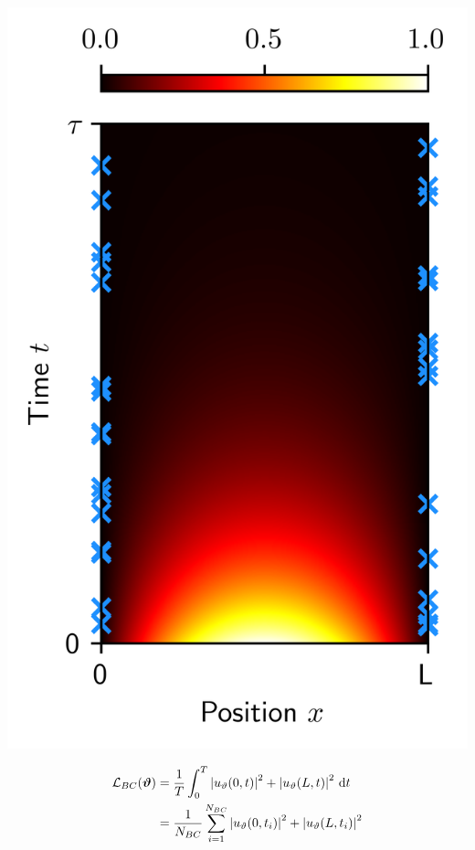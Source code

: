 \documentclass[aspectratio=169,compress,12pt,dvipsnames]{beamer}
\begin{document}
\begin{frame}
  \vfill
  \begin{minipage}{.28\textwidth}
    \centering
    \includegraphics[width=\textwidth]{boundary_conditions_sampling.png}
  \end{minipage}%
  \hfill
  \begin{minipage}{.68\textwidth}
    \[
      \begin{aligned}
        \mathcal{L}_{BC}(\boldsymbol{\vartheta}) &  = \dfrac{1}{T} \int_{0}^{T} \abs{ u_\vartheta(0, t) }^2 + \abs{u_{\vartheta}(L, t)}^2 \ \dd t \\
          & = \dfrac{1}{N_{BC}} \sum_{i=1}^{N_{BC}} \abs{ u_{\vartheta}(0, t_i) }^2 + \abs{ u_{\vartheta}(L, t_i) }^2
      \end{aligned}
    \]
  \end{minipage}
  \vfill
\end{frame}
\end{document}

